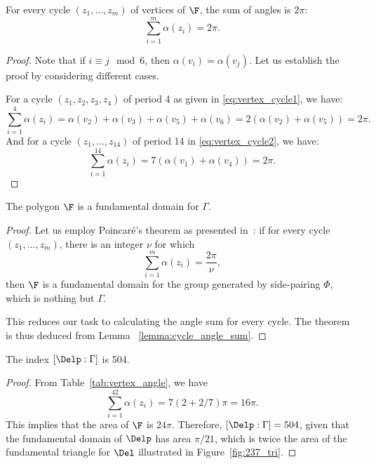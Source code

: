 \begin{lemma}\label{lemma:cycle_angle_sum}
For every cycle \( (z_1,\dots, z_m) \) of vertices of \( \F \), the sum of angles is \( 2\pi \):
\[
\sum_{i=1}^{m}\alpha(z_i) = 2\pi.
\]
\end{lemma}

\begin{proof}
Note that if $i\equiv j \mod 6$, then $\alpha(v_i) = \alpha(v_{j})$.
Let us establish the proof by considering different cases.

For a cycle $(z_1,z_2,z_3,z_4)$ of period 4 as given in \eqref{eq:vertex_cycle1}, 
we have:
\[
\sum_{i=1}^{4}\alpha(z_i) = 
\alpha(v_2)+\alpha(v_3)+\alpha(v_5)+\alpha(v_6)
=2(\alpha(v_2)+\alpha(v_5))
=2\pi.
\]
And for a cycle $(z_1,\dots,z_{14})$ of period 14 in \eqref{eq:vertex_cycle2}, 
we have:
\[
\sum_{i=1}^{14}\alpha(z_i) = 
7(\alpha(v_1)+\alpha(v_4))
=2\pi.
\]    
\end{proof}

\begin{thm} \label{thm:fund}
The polygon $\F$ is a fundamental domain for $\Gamma$.
\end{thm}
\begin{proof}
Let us employ Poincar\'{e}'s theorem as presented in~\cite{maskit1971}:
if for every cycle $(z_1,\dots, z_m)$, there is an integer $\nu$ for which
\[
\sum_{i=1}^{m}\alpha(z_i) = \frac{2\pi}{\nu},
\]
then $\F$ is a fundamental domain for the group generated by side-pairing $\Phi$, which is nothing but $\Gamma$.

This reduces our task to calculating the angle sum for every cycle.
The theorem is thus deduced from Lemma ~\ref{lemma:cycle_angle_sum}.
\end{proof}

\begin{prop}\label{prop:gammaindex}
The index $[\Delp:\Gamma]$ is 504.
\end{prop}
\begin{proof}
From Table~\ref{tab:vertex_angle}, we have
\[
\sum_{i=1}^{42}\alpha(z_i) = 7(2+2/7)\pi = 16\pi.
\]
This implies that the area of $\F$ is $24\pi$.
Therefore, $[\Delp:\Gamma]=504$, given that the fundamental domain of $\Delp$ has area $\pi/21$, which is twice the area of the fundamental triangle for $\Del$  illustrated in Figure~\ref{fig:237_tri}.
\end{proof}

